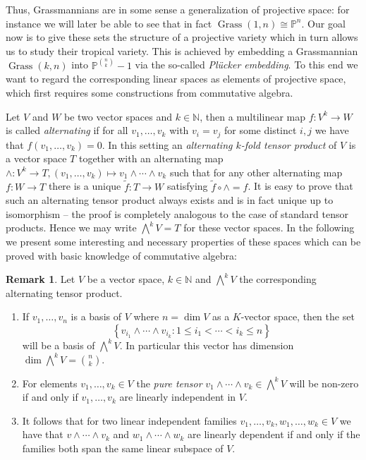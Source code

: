 \documentclass[
  paper=a4,
  titlepage,
  bibliography=totoc,
  pagesize=pdftex
]{scrartcl}
\numberwithin{figure}{section}
\numberwithin{equation}{section}
\numberwithin{table}{section}
\newcommand*\setN{\mathds{N}}
\newcommand*\setP{\mathds{P}}
\DeclareMathOperator{\Grass}{Grass}
\theoremstyle{definition}
\newtheorem{remark}[definition]{Remark}
\numberwithin{definition}{section}
\begin{document}
Thus, Grassmannians are in some sense a generalization of projective space: for instance
we will later be able to see that in fact $\Grass(1,n) \cong \setP^n$. Our goal now is to
give these sets the structure of a projective variety which in turn allows us to study
their tropical variety. This is achieved by embedding a Grassmannian $\Grass(k, n)$ into
$\setP^{\binom nk}-1$ via the so-called \emph{Plücker embedding}. To this end we want to
regard the corresponding linear spaces as elements of projective space, which first
requires some constructions from commutative algebra.

Let $V$ and $W$ be two vector spaces and $k\in\setN$, then a multilinear map $f : V^k \to
W$ is called \emph{alternating} if for all $v_1, \dots, v_k$ with $v_i=v_j$ for some
distinct $i,j$ we have that $f(v_1, \dots, v_k) = 0$. In this setting an \emph{alternating
$k$-fold tensor product} of $V$ is a vector space $T$ together with an alternating map
$\wedge:V^k\to T, (v_1, \dots, v_k) \mapsto v_1\wedge\cdots\wedge v_k$ such that for any
other alternating map $f:W\to T$ there is a unique $\tilde f:T\to W$ satisfying $\tilde f
\circ \wedge = f$. It is easy to prove that such an alternating tensor product always
exists and is in fact unique up to isomorphism -- the proof is completely analogous to the
case of standard tensor products. Hence we may write $\bigwedge^k V = T$ for these vector
spaces. In the following we present some interesting and necessary properties of these
spaces which can be proved with basic knowledge of commutative algebra:

\begin{remark}
  Let $V$ be a vector space, $k \in \setN$ and $\bigwedge^k V$ the corresponding
  alternating tensor product.
  \begin{enumerate}
    \item If $v_1, \dots, v_n$ is a basis of $V$ where $n=\dim V$ as a $K$-vector space,
      then the set
      \[
        \left\{
          v_{i_1} \wedge \cdots \wedge v_{i_k} : 1\leq i_1 < \cdots < i_k \leq n
        \right\}
      \]
      will be a basis of $\bigwedge^kV$. In particular this vector has dimension
      $\dim\bigwedge^kV = \binom nk$.
    \item For elements $v_1, \dots, v_k \in V$ the \emph{pure tensor} $v_1\wedge \cdots
      \wedge v_k \in \bigwedge^kV$ will be non-zero if and only if $v_1, \dots, v_k$ are
      linearly independent in $V$.
    \item It follows that for two linear independent families $v_1, \dots, v_k, w_1,
      \dots, w_k \in V$ we have that $v\wedge\cdots \wedge v_k$ and $w_1\wedge\cdots\wedge
      w_k$ are linearly dependent if and only if the families both span the same linear
      subspace of $V$.
  \end{enumerate}
\end{remark}
\end{document}
